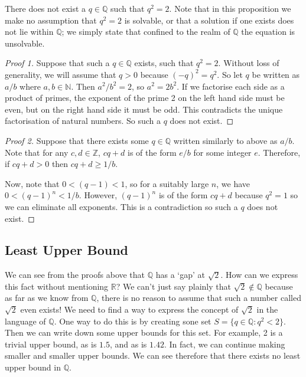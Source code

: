 \begin{proposition}
	There does not exist a \(q \in \mathbb Q\) such that \(q^2 = 2\).
	Note that in this proposition we make no assumption that \(q^2 = 2\) is solvable, or that a solution if one exists does not lie within \(\mathbb Q\); we simply state that confined to the realm of \(\mathbb Q\) the equation is unsolvable.
\end{proposition}
\begin{proof}[Proof 1]
	Suppose that such a \(q \in \mathbb Q\) exists, such that \(q^2 = 2\).
	Without loss of generality, we will assume that \(q>0\) because \((-q)^2 = q^2\).
	So let \(q\) be written as \(a/b\) where \(a, b \in \mathbb N\).
	Then \(a^2/b^2 = 2\), so \(a^2 = 2b^2\).
	If we factorise each side as a product of primes, the exponent of the prime 2 on the left hand side must be even, but on the right hand side it must be odd.
	This contradicts the unique factorisation of natural numbers.
	So such a \(q\) does not exist.
\end{proof}
\begin{proof}[Proof 2]
	Suppose that there exists some \(q \in \mathbb Q\) written similarly to above as \(a/b\).
	Note that for any \(c, d \in \mathbb Z\), \(cq + d\) is of the form \(e/b\) for some integer \(e\).
	Therefore, if \(cq+d>0\) then \(cq+d \geq 1/b\).

	Now, note that \(0 < (q - 1) < 1\), so for a suitably large \(n\), we have \(0 < (q - 1)^n < 1/b\).
	However, \((q-1)^n\) is of the form \(cq+d\) because \(q^2 = 1\) so we can eliminate all exponents.
	This is a contradiction so such a \(q\) does not exist.
\end{proof}

\subsection{Least Upper Bound}
We can see from the proofs above that \(\mathbb Q\) has a `gap' at \(\sqrt 2\).
How can we express this fact without mentioning \(\mathbb R\)?
We can't just say plainly that \(\sqrt 2 \notin \mathbb Q\) because as far as we know from \(\mathbb Q\), there is no reason to assume that such a number called \(\sqrt 2\) even exists!
We need to find a way to express the concept of \(\sqrt 2\) in the language of \(\mathbb Q\).
One way to do this is by creating sone set \(S = \{ q \in \mathbb Q: q^2 < 2 \}\).
Then we can write down some upper bounds for this set.
For example, 2 is a trivial upper bound, as is \(1.5\), and as is \(1.42\).
In fact, we can continue making smaller and smaller upper bounds.
We can see therefore that there exists no least upper bound in \(\mathbb Q\).

